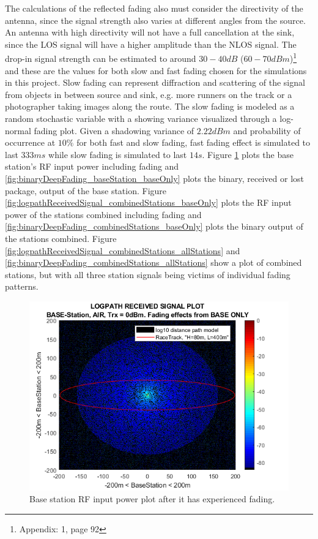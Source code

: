 \noindent The calculations of the reflected fading also must consider the directivity of the antenna, since the signal strength also varies at different angles from the source. An antenna with high directivity will not have a full cancellation at the sink, since the LOS signal will have a higher amplitude than the NLOS signal. The drop-in signal strength can be estimated to around $30-40dB$ ($60-70dBm$)\footnote{Appendix: 1, \cite{Karl2006} page 92} and these are the values for both slow and fast fading chosen for the simulations in this project. Slow fading can represent diffraction and scattering of the signal from objects in between source and sink, e.g. more runners on the track or a photographer taking images along the route. The slow fading is modeled as a random stochastic variable with a showing variance visualized through a log-normal fading plot. Given a shadowing variance of $2.22dBm$ and probability of occurrence at $10\%$ for both fast and slow fading, fast fading effect is simulated to last $333 ms$ while slow fading is simulated to last $14s$. Figure \ref{fig:logpathReceivedSignal_baseStation_baseOnly} plots the base station's RF input power including fading and \ref{fig:binaryDeepFading_baseStation_baseOnly} plots the binary, received or lost package, output of the base station. Figure \ref{fig:logpathReceivedSignal_combinedStations_baseOnly} plots the RF input power of the stations combined including fading and \ref{fig:binaryDeepFading_combinedStations_baseOnly} plots the binary output of the stations combined. Figure \ref{fig:logpathReceivedSignal_combinedStations_allStations} and \ref{fig:binaryDeepFading_combinedStations_allStations} show a plot of combined stations, but with all three station signals being victims of individual fading patterns. 

\begin{figure}[h]
	\centering
	\includegraphics[width=\linewidth]{theory/fading/fig/logpathReceivedSignal_baseStation_baseOnly.png}
	\caption{Base station RF input power plot after it has experienced fading.}
	\label{fig:logpathReceivedSignal_baseStation_baseOnly}
\end{figure}

